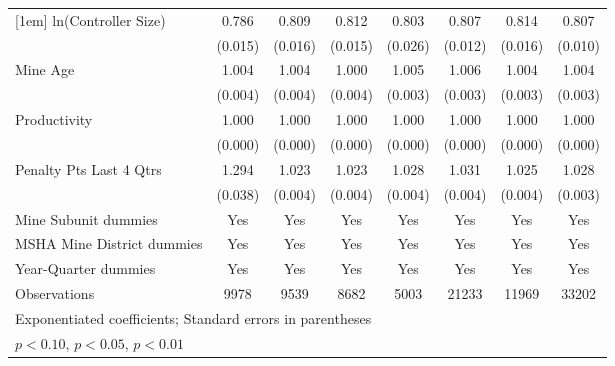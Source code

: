 {\begin{tabular}{l*{7}{c}}
[1em]
ln(Controller Size)      &       0.786\sym{***}&       0.809\sym{***}&       0.812\sym{***}&       0.803\sym{***}&       0.807\sym{***}&       0.814\sym{***}&       0.807\sym{***}\\
                         &     (0.015)         &     (0.016)         &     (0.015)         &     (0.026)         &     (0.012)         &     (0.016)         &     (0.010)         \\
[1em]
Mine Age                 &       1.004         &       1.004         &       1.000         &       1.005\sym{*}  &       1.006\sym{*}  &       1.004         &       1.004\sym{*}  \\
                         &     (0.004)         &     (0.004)         &     (0.004)         &     (0.003)         &     (0.003)         &     (0.003)         &     (0.003)         \\
[1em]
Productivity             &       1.000         &       1.000\sym{**} &       1.000         &       1.000         &       1.000\sym{**} &       1.000         &       1.000\sym{**} \\
                         &     (0.000)         &     (0.000)         &     (0.000)         &     (0.000)         &     (0.000)         &     (0.000)         &     (0.000)         \\
[1em]
Penalty Pts Last 4 Qtrs  &       1.294\sym{***}&       1.023\sym{***}&       1.023\sym{***}&       1.028\sym{***}&       1.031\sym{***}&       1.025\sym{***}&       1.028\sym{***}\\
                         &     (0.038)         &     (0.004)         &     (0.004)         &     (0.004)         &     (0.004)         &     (0.004)         &     (0.003)         \\
[1em]
Mine Subunit dummies     &         Yes         &         Yes         &         Yes         &         Yes         &         Yes         &         Yes         &         Yes         \\
[1em]
MSHA Mine District dummies&         Yes         &         Yes         &         Yes         &         Yes         &         Yes         &         Yes         &         Yes         \\
[1em]
Year-Quarter dummies     &         Yes         &         Yes         &         Yes         &         Yes         &         Yes         &         Yes         &         Yes         \\
\hline
Observations             &        9978         &        9539         &        8682         &        5003         &       21233         &       11969         &       33202         \\
\hline\hline
\multicolumn{8}{l}{\footnotesize Exponentiated coefficients; Standard errors in parentheses}\\
\multicolumn{8}{l}{\footnotesize \sym{*} \(p<0.10\), \sym{**} \(p<0.05\), \sym{***} \(p<0.01\)}\\
\end{tabular}
}
